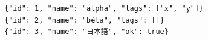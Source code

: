 \documentclass[11pt,a4paper]{article}
\begin{document}
\begin{verbatim}
{"id": 1, "name": "alpha", "tags": ["x", "y"]}
{"id": 2, "name": "béta", "tags": []}
{"id": 3, "name": "日本語", "ok": true}
\end{verbatim}
\end{document}
